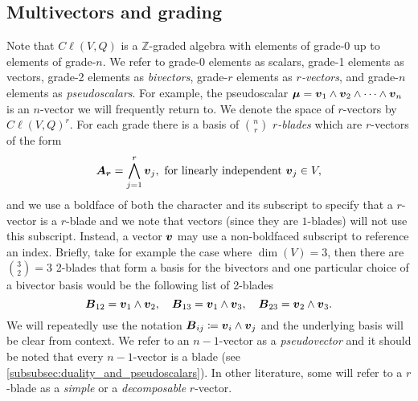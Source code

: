 \subsection{Multivectors and grading}
Note that $C\ell(V,Q)$ is a $\mathbb{Z}$-graded algebra with elements of grade-0 up to elements of grade-$n$. We refer to grade-0 elements as scalars, grade-1 elements as vectors, grade-2 elements as \emph{bivectors}, grade-$r$ elements as \emph{$r$-vectors}, and grade-$n$ elements as \emph{pseudoscalars}. For example, the pseudoscalar $\boldsymbol{\mu} = \boldsymbol{v}_1 \wedge \boldsymbol{v}_2 \wedge \cdots \wedge \boldsymbol{v}_n$ is an $n$-vector we will frequently return to. We denote the space of $r$-vectors by $C\ell(V,Q)^r$. For each grade there is a basis of ${n\choose r}$ \emph{$r$-blades} which are $r$-vectors of the form
\begin{equation}
\label{eq:blade}
\boldsymbol{A_r} = \bigwedge_{j=1}^r \boldsymbol{v}_j, ~\textrm{for linearly independent}~ \boldsymbol{v}_j \in V,
\end{equation}
and we use a boldface of both the character and its subscript to specify that a $r$-vector is a $r$-blade and we note that vectors (since they are $1$-blades) will not use this subscript. Instead, a vector $\boldsymbol{v}$ may use a non-boldfaced subscript to reference an index. Briefly, take for example the case where $\dim(V)=3$, then there are ${3\choose 2}=3$ 2-blades that form a basis for the bivectors and one particular choice of a bivector basis would be the following list of 2-blades
\begin{equation}
\label{eq:3_dim_basis}
\boldsymbol{B}_{12} = \boldsymbol{v}_1 \wedge \boldsymbol{v}_2, \quad \boldsymbol{B}_{13} = \boldsymbol{v}_1 \wedge \boldsymbol{v}_3, \quad \boldsymbol{B}_{23} = \boldsymbol{v}_2 \wedge \boldsymbol{v}_3.
\end{equation}
We will repeatedly use the notation $\boldsymbol{B}_{ij} \coloneqq \boldsymbol{v}_i\wedge \boldsymbol{v}_j$ and the underlying basis will be clear from context. We refer to an $n-1$-vector as a \emph{pseudovector} and it should be noted that every $n-1$-vector is a blade (see \cref{subsubsec:duality_and_pseudoscalars}). In other literature, some will refer to a $r$-blade as a \emph{simple} or a \emph{decomposable} $r$-vector. 

